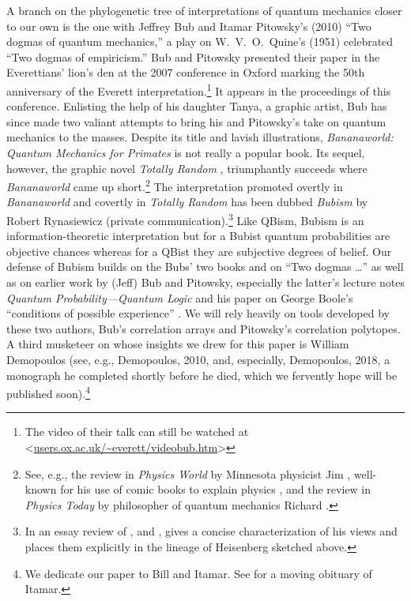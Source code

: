A branch on the phylogenetic tree of interpretations of quantum mechanics closer to our own is the one with Jeffrey Bub and Itamar Pitowsky's (2010) ``Two dogmas of quantum mechanics,''  a play on W.\ V.\ O.\ Quine's (1951) celebrated ``Two dogmas of empiricism.'' Bub and Pitowsky presented their paper in the Everettians' lion's den at the 2007 conference in Oxford marking the 50th anniversary of the Everett interpretation.\footnote{The video of their talk can still be watched at 
\textless\url{users.ox.ac.uk/~everett/videobub.htm}\textgreater} It appears in the proceedings of this conference. Enlisting the help of his daughter Tanya, a graphic artist, Bub has since made two valiant attempts to bring his and Pitowsky's take on quantum mechanics to the masses. Despite its title and lavish illustrations, \emph{Bananaworld: Quantum Mechanics for Primates} \citep{Bub 2016} is not really a popular book. Its sequel, however, the graphic novel \emph{Totally Random} \citep{Bub and Bub 2018}, triumphantly succeeds where  \emph{Bananaworld} came up short.\footnote{See, e.g., the review in \emph{Physics World} by Minnesota physicist Jim \citet{Kakalios 2018}, well-known for his use of comic books to explain physics \citep{Kakalios 2009}, and the review in \emph{Physics Today} by philosopher of quantum mechanics Richard \citet{Healey 2019}.} The interpretation promoted overtly in \emph{Bananaworld} and covertly in \emph{Totally Random} has been dubbed \emph{Bubism} by Robert Rynasiewicz (private communication).\footnote{In an essay review of \citet{Ball 2018}, \citet{Becker 2018} and \citet{Freire 2015}, \citet{Bub 2019} gives a concise characterization of his views and places them explicitly in the lineage of Heisenberg sketched above.} 
Like QBism, Bubism is an information-theoretic interpretation but for a Bubist quantum probabilities are objective chances whereas for a QBist they are subjective degrees of belief. Our defense of Bubism builds on the Bubs' two books and on ``Two dogmas \ldots'' as well as on earlier work by (Jeff) Bub and Pitowsky, especially the latter's lecture notes \emph{Quantum Probability---Quantum Logic} and his paper on George Boole's ``conditions of possible experience'' \citep{Pitowsky 1989a, Pitowsky 1994}. We will rely heavily on tools developed by these two authors, Bub's correlation arrays and Pitowsky's correlation polytopes. A third musketeer on whose insights we drew for this paper is William Demopoulos (see, e.g., Demopoulos, 2010, and, especially, Demopoulos, 2018, a monograph he completed shortly before he died, which we fervently hope will be published soon).\footnote{We dedicate our paper to Bill and Itamar. See \citet{Bub and Demopoulos 2010} for a moving obituary of Itamar.} 

